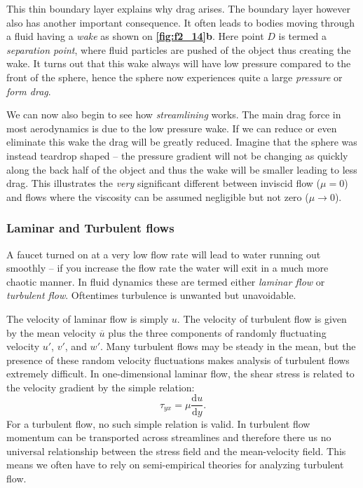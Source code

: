 This thin boundary layer explains why drag arises. The boundary layer however also has another important consequence. It often leads to bodies moving through a fluid having a \textit{wake} as shown on \textbf{\autoref{fig:f2_14}b}. Here point $D$ is termed a \textit{separation point}, where fluid particles are pushed of the object thus creating the wake. It turns out that this wake always will have low pressure compared to the front of the sphere, hence the sphere now experiences quite a large \textit{pressure} or \textit{form drag}.

We can now also begin to see how \textit{streamlining} works. The main drag force in most aerodynamics is due to the low pressure wake. If we can reduce or even eliminate this wake the drag will be greatly reduced. Imagine that the sphere was instead teardrop shaped -- the pressure gradient will not be changing as quickly along the back half of the object and thus the wake will be smaller leading to less drag. This illustrates the \textit{very} significant different between inviscid flow ($\mu = 0$) and flows where the viscosity can be assumed negligible but not zero ($\mu\to 0$).

\subsubsection{Laminar and Turbulent flows}
A faucet turned on at a very low flow rate will lead to water running out smoothly -- if you increase the flow rate the water will exit in a much more chaotic manner. In fluid dynamics these are termed either \textit{laminar flow} or \textit{turbulent flow}. Oftentimes turbulence is unwanted but unavoidable.

The velocity of laminar flow is simply $u$. The velocity of turbulent flow is given by the mean velocity $\overline{u}$ plus the three components of randomly fluctuating velocity $u'$, $v'$, and $w'$. Many turbulent flows may be steady in the mean, but the presence of these random velocity fluctuations makes analysis of turbulent flows extremely difficult. In one-dimensional laminar flow, the shear stress is related to the velocity gradient by the simple relation:
\[ 
\tau_{yx} = \mu \frac{\mathrm{d}u}{\mathrm{d}y} 
.\]
For a turbulent flow, no such simple relation is valid. In turbulent flow momentum can be transported across streamlines and therefore there us no universal relationship between the stress field and the mean-velocity field. This means we often have to rely on semi-empirical theories for analyzing turbulent flow.

